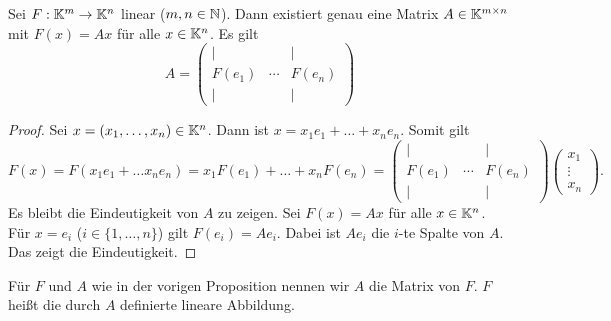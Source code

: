 \begin{propn}
	Sei $ F : \mathbb K^m \to \mathbb K^n $ linear ($ m,n \in \mathbb N $). Dann existiert genau eine Matrix $ A \in \mathbb K^{m \times n} $ mit $ F(x) = Ax $ für alle $ x \in \mathbb K^n $. Es gilt \[
		 A = \begin{pmatrix} 
		 | & & |
		 \\ F(e_1) & \cdots &  F(e_n) 
		 \\ | & & | \end{pmatrix} 
	\]
\end{propn}
\begin{proof}
	Sei $ x = (x_1, \ldots, x_n) \in \mathbb K^n $. Dann ist $ x = x_1e_1 + \ldots + x_ne_n $. Somit gilt
	\begin{equation*}
		F(x) = F(x_1e_1 + \ldots x_ne_n) = x_1F(e_1) + \ldots + x_nF(e_n) = 
		\begin{pmatrix} 
		| & & |
		\\ F(e_1) & \cdots &  F(e_n) 
		\\ | & & | \end{pmatrix} 
		\begin{pmatrix}
		x_1 \\ \vdots \\ x_n
		\end{pmatrix}.
	\end{equation*}
	Es bleibt die Eindeutigkeit von $ A $ zu zeigen. Sei $ F(x) = Ax $ für alle $ x \in \mathbb K^n $. Für $ x = e_i $ ($ i \in \{ 1, \ldots, n \} $) gilt $ F(e_i) = Ae_i $. Dabei ist $ Ae_i $ die $ i $-te Spalte von $A$. Das zeigt die Eindeutigkeit. 
\end{proof}

\noindent Für $ F $ und $ A $ wie in der vorigen Proposition nennen wir $ A $ die Matrix von $ F $. $ F $ heißt die durch $ A $ definierte lineare Abbildung.

